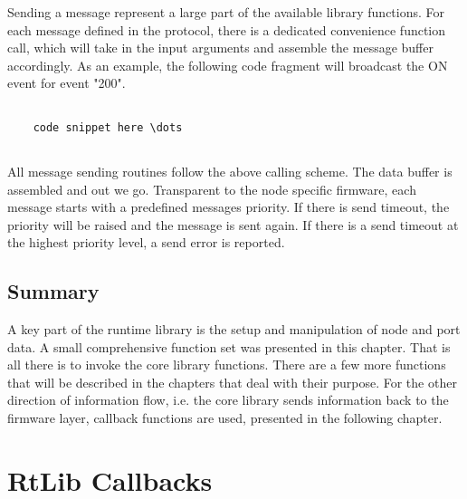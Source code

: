 Sending a message represent a large part of the available library functions. For each message defined in the protocol, there is a dedicated convenience function call, which will take in the input arguments and assemble the message buffer accordingly. As an example, the following code fragment will broadcast the ON event for event "200".

\lstset{language=c++, style=codesnippetstyle}
\begin{lstlisting}
   
    code snippet here \dots
    
\end{lstlisting}

All message sending routines follow the above calling scheme. The data buffer is assembled and out we go. Transparent to the node specific firmware, each message starts with a predefined messages priority. If there is send timeout, the priority will be raised and the message is sent again. If there is a send timeout at the highest priority level, a send error is reported.

\section{Summary}

A key part of the runtime library is the setup and manipulation of node and port data. A small comprehensive function set was presented in this chapter. That is all there is to invoke the core library functions. There are a few more functions that will be described in the chapters that deal with their purpose. For the other direction of information flow, i.e. the core library sends information back to the firmware layer, callback functions are used, presented in the following chapter.

\chapter{RtLib Callbacks}

